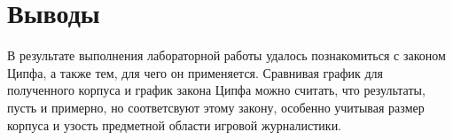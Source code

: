 \section{Выводы}
В результате выполнения лабораторной работы удалось познакомиться с законом Ципфа, а также тем, для чего он применяется. Сравнивая график для полученного корпуса и график закона Ципфа можно считать, что результаты, пусть и примерно, но соответсвуют этому закону, особенно учитывая размер корпуса и узость предметной области игровой журналистики.
\pagebreak
